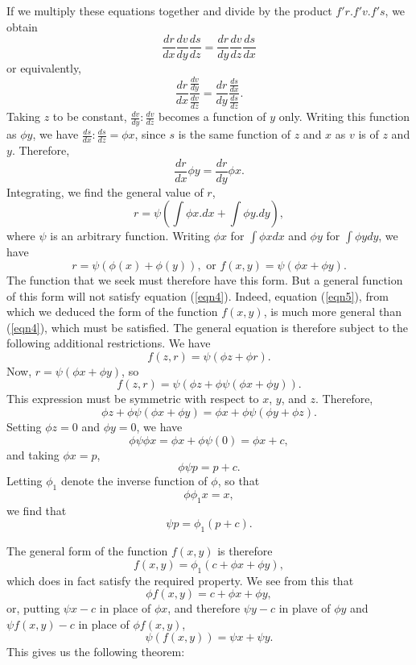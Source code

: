 \documentclass[12pt]{article}
\begin{document}
If we multiply these equations together and divide by the product $f'r.f'v.f's$, we obtain
\begin{equation} \label{eqn5} \frac{dr}{dx} \frac{dv}{dy} \frac{ds}{dz} = \frac{dr}{dy} \frac{dv}{dz} \frac{ds}{dx} \end{equation}
or equivalently,
\[ \frac{dr}{dx} \frac{\frac{dv}{dy}}{\frac{dv}{dz}} = \frac{dr}{dy} \frac{\frac{ds}{dx}}{\frac{ds}{dz}} . \]
Taking $z$ to be constant, $\frac{dv}{dy}:\frac{dv}{dz}$ becomes a function of $y$ only.  Writing this function as $\phi y$, we have $\frac{ds}{dx} : \frac{ds}{dz} = \phi x$, since $s$ is the same function of $z$ and $x$ as $v$ is of $z$ and $y$.  Therefore,
\begin{equation} \label{eqn6} \frac{dr}{dx} \phi y = \frac{dr}{dy} \phi x .\end{equation}
Integrating, we find the general value of $r$,
\[ r = \psi\left(\int \phi x.dx + \int \phi y . dy\right),  \]
where $\psi$ is an arbitrary function.  Writing $\phi x$ for $\int \phi x dx$ and $\phi y$ for $\int \phi y  dy$, we have 
\begin{equation} \label{eqn7} r = \psi(\phi(x) + \phi(y)), \textrm{ or } f(x,y) = \psi(\phi x + \phi y). \end{equation}
The function that we seek must therefore have this form.  But a general function of this form will not satisfy equation (\ref{eqn4}).  Indeed, equation (\ref{eqn5}), from which we deduced the form of the function $f(x,y)$, is much more general than (\ref{eqn4}), which must be satisfied.  The general equation is therefore subject to the following additional restrictions.  We have 
\[ f(z,r) = \psi(\phi z + \phi r). \]
Now, $r = \psi(\phi x + \phi y )$, so
\[ f(z,r) = \psi(\phi z + \phi \psi (\phi x + \phi y)) . \]
This expression must be symmetric with respect to $x$, $y$, and $z$.  Therefore,
\[ \phi z + \phi \psi ( \phi x + \phi y) = \phi x + \phi \psi ( \phi y + \phi z) . \]
Setting $\phi z = 0$ and $\phi y = 0$, we have 
\[ \phi \psi \phi x = \phi x + \phi \psi (0) = \phi x + c, \]
and taking $\phi x = p$,
\[ \phi \psi p  = p + c .\]
Letting $\phi_1$ denote the inverse function of $\phi$, so that 
\[ \phi \phi_1 x = x, \]
we find that 
\[ \psi p = \phi_1(p+c). \]

The general form of the function $f(x,y)$ is therefore
\[ f(x,y) = \phi_1(c + \phi x + \phi y), \]
which does in fact satisfy the required property.  We see from this that 
\[ \phi f(x,y) = c + \phi x + \phi y, \]
or, putting $\psi x - c$ in place of $\phi x$, and therefore $\psi y - c$ in plave of $\phi y$ and $\psi f(x,y) - c$ in place of $\phi f(x,y)$,
\[ \psi(f(x,y)) = \psi x + \psi y. \]
This gives us the following theorem:
\end{document}
